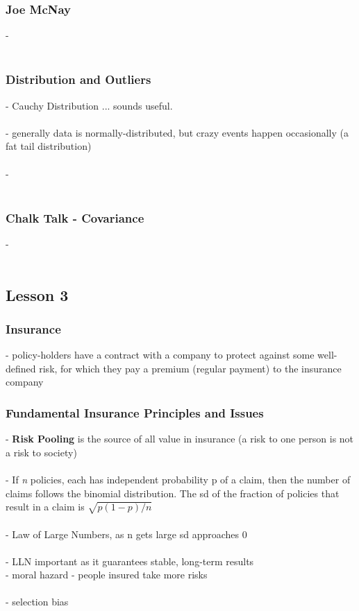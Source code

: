 \documentclass{article} %
\begin{document}
     		 \subsubsection*{Joe McNay}
     		 - \\
     		 \\
     		 \subsubsection*{Distribution and Outliers}
     		 - Cauchy Distribution ... sounds useful. \\
     		 \\
     		 - generally data is normally-distributed, but crazy events happen occasionally (a fat tail distribution) \\
     		 \\
     		 -  \\
		\\
		\subsubsection*{Chalk Talk - Covariance}
		- \\
		\\
		\subsubsection*{} 

	\subsection*{Lesson 3}

		\subsubsection*{Insurance}
		- policy-holders have a contract with a company to protect against some well-defined risk, for which they pay a premium (regular payment) to the insurance company
		
		\subsubsection*{Fundamental Insurance Principles and Issues}
		- \textbf{Risk Pooling} is the source of all value in insurance (a risk to one person is not a risk to society) \\
		\\
		- If \textit{n} policies, each has independent probability p of a claim, then the number of claims follows the binomial distribution. The sd of the fraction of policies that result in a claim is $\sqrt{p(1-p)/n}$ \\
		\\
		- Law of Large Numbers, as n gets large sd approaches 0 \\
		\\
		- LLN important as it guarantees stable, long-term results
		 \\
		- moral hazard - people insured take more risks \\
		\\
		- selection bias 
		
\end{document}
